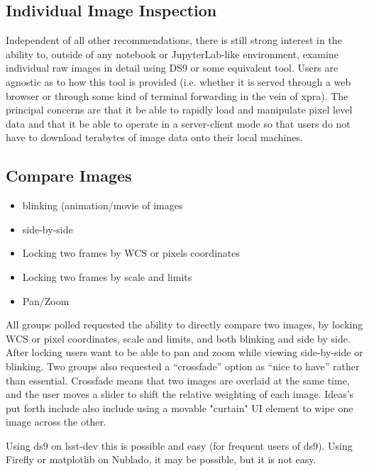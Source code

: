 \subsection{Individual Image Inspection}
\label{sec:ds9}
Independent of all other recommendations, there is still strong interest in the
ability to, outside of any notebook or JupyterLab-like environment, examine
individual raw images in detail using DS9 or some equivalent tool.  Users are
agnostic as to how this tool is provided (i.e. whether it is served through a
web browser or through some kind of terminal forwarding in the vein of xpra).
The principal concerns are that it be able to rapidly load and manipulate pixel
level data and that it be able to operate in a server-client mode so that users
do not have to download terabytes of image data onto their local machines.


\subsection{Compare Images}
\begin{itemize}
\item{blinking (animation/movie of images}
\item{side-by-side}
\item{Locking two frames by WCS or pixels coordinates}
\item{Locking two frames by scale and limits}
\item{Pan/Zoom}
\end{itemize}

All groups polled requested the ability to directly compare two images, by locking WCS or pixel coordinates, scale and limits, and both blinking and side by side.
After locking users want to be able to pan and zoom while viewing side-by-side or blinking.
Two groups also requested a ``crossfade'' option as ``nice to have'' rather than essential.
Crossfade means that two images are overlaid at the same time, and the user moves a slider to shift the relative weighting of each image.
Ideas's put forth include also include using a movable "curtain" UI element to wipe one image across the other.

Using ds9 on lsst-dev this is possible and easy (for frequent users of ds9).
Using Firefly or matplotlib on Nublado, it may be possible, but it is not easy.

